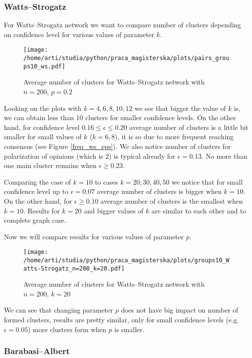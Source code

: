 \documentclass{article}
\begin{document}
\subsubsection{Watts--Strogatz}

For Watts--Strogatz network we want to compare number of clusters depending on confidence level for various values of parameter $k$.

\begin{figure}[H]
		\centering
		\texttt{[image: /home/arti/studia/python/praca\_magisterska/plots/pairs\_groups10\_ws.pdf]}
		\caption{Average number of clusters for Watts--Strogatz network with $n=200$, $p=0.2$}
\end{figure}

Looking on the plots with $k=4,6,8,10,12$ we see that bigger the value of $k$ is, we can obtain less than 10 clusters for smaller confidence levels. On the other hand, for confidence level $0.16 \leq \epsilon \leq 0.20$ average number of clusters is a little bit smaller for small values of $k$ ($k=6,8$), it is so due to more frequent reaching consensus (see Figure \ref{freq_ws_eps}). We also notice number of clusters for polarization of opinions (which is $2$) is typical already for $\epsilon=0.13$. No more than one main cluster remains when $\epsilon \geq 0.23$.
\indent

Comparing the case of $k=10$ to cases $k=20,30,40,50$ we notice that for small confidence level up to $\epsilon=0.07$ average number of clusters is bigger when $k=10$. On the other hand, for $\epsilon \geq 0.10$ average number of clusters is the smallest when $k=10$. Results for $k=20$ and bigger values of $k$ are similar to each other and to complete graph case.

\indent

Now we will compare results for various values of parameter $p$.

\begin{figure}[H]
		\centering
		\texttt{[image: /home/arti/studia/python/praca\_magisterska/plots/groups10\_Watts-Strogatz\_n=200\_k=20.pdf]}
		\caption{Average number of clusters for Watts--Strogatz network with $n=200$, $k=20$}
\end{figure}

We can see that changing parameter $p$ does not have big impact on number of formed clusters, results are pretty similar, only for small confidence levels (e.g. $\epsilon=0.05$) more clusters form when $p$ is smaller.

\subsubsection{Barabasi--Albert}
\end{document}
